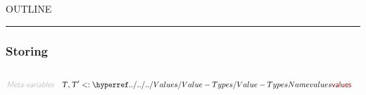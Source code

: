 


    OUTLINE
  \tableofcontents
\begin{center}
\rule{3in}{0.4pt}
\end{center}

\subsubsection{Storing}\hypertarget{storing}{}\label{storing}

\begin{align*}
  [ \
  \KEY{Datatype} \quad & \NAMEREF{locations} \\
  \KEY{Alias} \quad & \NAMEREF{locs} \\
  \KEY{Type} \quad & \NAMEREF{stores} \\
  \KEY{Entity} \quad & \NAMEREF{store} \\
  \KEY{Funcon} \quad & \NAMEREF{initialise-storing} \\
  \KEY{Funcon} \quad & \NAMEREF{store-clear} \\
  \KEY{Datatype} \quad & \NAMEREF{variables} \\
  \KEY{Alias} \quad & \NAMEREF{vars} \\
  \KEY{Funcon} \quad & \NAMEREF{variable} \\
  \KEY{Alias} \quad & \NAMEREF{var} \\
  \KEY{Funcon} \quad & \NAMEREF{allocate-variable} \\
  \KEY{Alias} \quad & \NAMEREF{alloc} \\
  \KEY{Funcon} \quad & \NAMEREF{recycle-variables} \\
  \KEY{Alias} \quad & \NAMEREF{recycle} \\
  \KEY{Funcon} \quad & \NAMEREF{initialise-variable} \\
  \KEY{Alias} \quad & \NAMEREF{init} \\
  \KEY{Funcon} \quad & \NAMEREF{allocate-initialised-variable} \\
  \KEY{Alias} \quad & \NAMEREF{alloc-init} \\
  \KEY{Funcon} \quad & \NAMEREF{assign} \\
  \KEY{Funcon} \quad & \NAMEREF{assigned} \\
  \KEY{Funcon} \quad & \NAMEREF{current-value} \\
  \KEY{Funcon} \quad & \NAMEREF{un-assign} \\
  \KEY{Funcon} \quad & \NAMEREF{structural-assign} \\
  \KEY{Funcon} \quad & \NAMEREF{structural-assigned}
  \ ]
\end{align*}
\begin{align*}
  \KEY{Meta-variables} \quad
  & \VAR{T}, \VAR{T}' <: \NAMEHYPER{../../../Values}{Value-Types}{values}
\end{align*}
